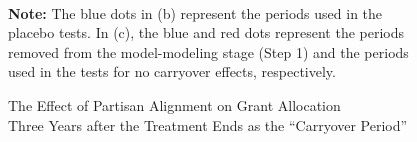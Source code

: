 \documentclass[12pt]{article}
\begin{document}
\begin{figure}[!ht]
\caption{The Effect of Partisan Alignment on Grant Allocation\\Three Years after the Treatment Ends as the ``Carryover Period''}\label{fg:FM2015b}
\centering
\begin{minipage}{0.9\linewidth}{
\centering
{}\\
}
\footnotesize\textbf{Note:} The blue dots in (b) represent the periods used in the placebo tests. In (c), the blue and red dots represent the periods removed from the model-modeling stage (Step 1) and the periods used in the tests for no carryover effects, respectively. 
\end{minipage}
\end{figure}
\clearpage
\end{document}
